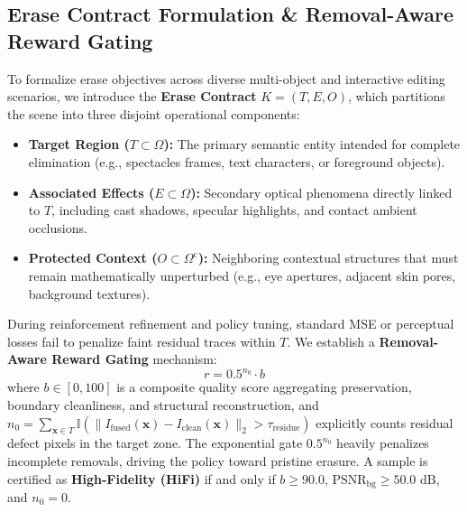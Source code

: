 \documentclass[11pt,a4paper]{article}
\begin{document}
\subsection{Erase Contract Formulation \& Removal-Aware Reward Gating}
\label{sec:erase_contract}
To formalize erase objectives across diverse multi-object and interactive editing scenarios, we introduce the \textbf{Erase Contract} $K = (T, E, O)$, which partitions the scene into three disjoint operational components:
\begin{itemize}[leftmargin=18pt]
    \item \textbf{Target Region ($T \subset \Omega$):} The primary semantic entity intended for complete elimination (e.g., spectacles frames, text characters, or foreground objects).
    \item \textbf{Associated Effects ($E \subset \Omega$):} Secondary optical phenomena directly linked to $T$, including cast shadows, specular highlights, and contact ambient occlusions.
    \item \textbf{Protected Context ($O \subset \Omega^{\text{c}}$):} Neighboring contextual structures that must remain mathematically unperturbed (e.g., eye apertures, adjacent skin pores, background textures).
\end{itemize}
During reinforcement refinement and policy tuning, standard MSE or perceptual losses fail to penalize faint residual traces within $T$. We establish a \textbf{Removal-Aware Reward Gating} mechanism:
\begin{equation}
    r = 0.5^{n_0} \cdot b
\end{equation}
where $b \in [0, 100]$ is a composite quality score aggregating preservation, boundary cleanliness, and structural reconstruction, and $n_0 = \sum_{\mathbf{x} \in T} \mathbb{I}(\|I_{\text{fused}}(\mathbf{x}) - I_{\text{clean}}(\mathbf{x})\|_2 > \tau_{\text{residue}})$ explicitly counts residual defect pixels in the target zone. The exponential gate $0.5^{n_0}$ heavily penalizes incomplete removals, driving the policy toward pristine erasure. A sample is certified as \textbf{High-Fidelity (HiFi)} if and only if $b \ge 90.0$, $\text{PSNR}_{\text{bg}} \ge 50.0\text{ dB}$, and $n_0 = 0$.
\end{document}
